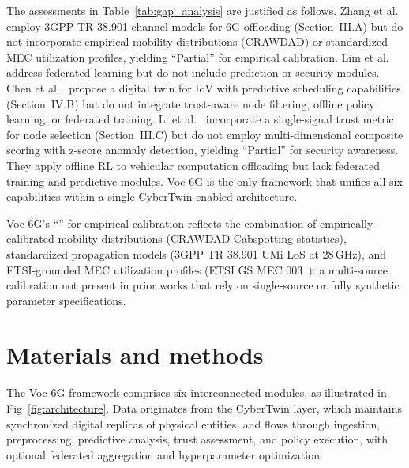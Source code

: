 \documentclass[10pt,letterpaper]{article}
\providecommand{\VocSixG}{Voc-6G}
\begin{document}
The assessments in Table~\ref{tab:gap_analysis} are justified as follows. Zhang et al.~\cite{ref_offload1} employ 3GPP TR 38.901 channel models for 6G offloading (Section~III.A) but do not incorporate empirical mobility distributions (CRAWDAD) or standardized MEC utilization profiles, yielding ``Partial'' for empirical calibration. Lim et al.~\cite{ref_fl_edge} address federated learning but do not include prediction or security modules. Chen et al.~\cite{ref_dtIoV} propose a digital twin for IoV with predictive scheduling capabilities (Section~IV.B) but do not integrate trust-aware node filtering, offline policy learning, or federated training. Li et al.~\cite{ref_offload2} incorporate a single-signal trust metric for node selection (Section~III.C) but do not employ multi-dimensional composite scoring with z-score anomaly detection, yielding ``Partial'' for security awareness. They apply offline RL to vehicular computation offloading but lack federated training and predictive modules. \VocSixG{} is the only framework that unifies all six capabilities within a single CyberTwin-enabled architecture.

\VocSixG{}'s ``\checkmark'' for empirical calibration reflects the combination of empirically-calibrated mobility distributions (CRAWDAD Cabspotting statistics), standardized propagation models (3GPP TR 38.901 UMi LoS at 28\,GHz), and ETSI-grounded MEC utilization profiles (ETSI GS MEC 003~\cite{etsi_mec003}): a multi-source calibration not present in prior works that rely on single-source or fully synthetic parameter specifications.


\section*{Materials and methods}
\label{sec:architecture}

The \VocSixG{} framework comprises six interconnected modules, as illustrated in Fig~\ref{fig:architecture}. Data originates from the CyberTwin layer, which maintains synchronized digital replicas of physical entities, and flows through ingestion, preprocessing, predictive analysis, trust assessment, and policy execution, with optional federated aggregation and hyperparameter optimization.
\end{document}
